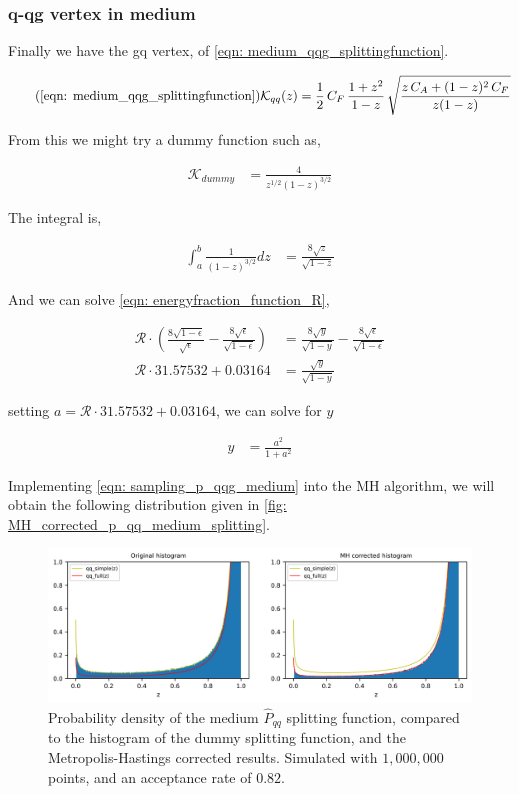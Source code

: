\documentclass[main.tex]{subfiles}
\begin{document}
\subsubsection{q-qg vertex in medium}
Finally we have the gq vertex, of \autoref{eqn: medium_qqg_splittingfunction}. 

\begin{equation}\tag{\ref{eqn: medium_qqg_splittingfunction}}
     \mathcal{K}_{qq}(z) = \frac{1}{2} \, C_F \, \frac{1+z^2}{1-z} \, \sqrt{\frac{z\, C_A + (1-z)^2 \, C_F}{z(1-z)}}
\end{equation}

From this we might try a dummy function such as, 

\begin{align}
    \mathcal{K}_{dummy} &= \frac{4}{z^{1/2} (1-z)^{3/2}}
\end{align}

The integral is, 

\begin{align}
    \int_a^b \frac{1}{(1-z)^{3/2}} dz &= \frac{8 \sqrt{z}}{\sqrt{1-z}}
\end{align}

And we can solve \autoref{eqn: energyfraction_function_R}, 

\begin{align}
    \mathcal{R} \cdot \left( \frac{8 \sqrt{1-\epsilon}}{\sqrt{\epsilon}} - \frac{8 \sqrt{\epsilon}}{\sqrt{1-\epsilon}} \right) &= \frac{8\sqrt{y}}{\sqrt{1-y}} - \frac{8\sqrt{\epsilon}}{\sqrt{1-\epsilon}} \nonumber\\
    \mathcal{R} \cdot 31.57532 + 0.03164  &= \frac{\sqrt{y}}{\sqrt{1-y}}
\end{align}

setting \(a = \mathcal{R} \cdot 31.57532 + 0.03164\), we can solve for \(y\)

\begin{align} \label{eqn: sampling_p_qqg_medium}
    y &= \frac{a^2}{1 + a^2} 
\end{align}

Implementing \autoref{eqn: sampling_p_qqg_medium} into the MH algorithm, we will obtain the following distribution given in \autoref{fig: MH_corrected_p_qq_medium_splitting}.

\begin{figure}[ht]
    \centering
    \includegraphics[width=14cm]{pictures/MH_plots/MH_medium_qq.png}
    \caption{Probability density of the medium \(\hat{P}_{qq}\) splitting function, compared to the histogram of the dummy splitting function, and the Metropolis-Hastings corrected results. Simulated with \(1,000,000\) points, and an acceptance rate of \(0.82\).}
    \label{fig: MH_corrected_p_qq_medium_splitting}
\end{figure}
\end{document}
